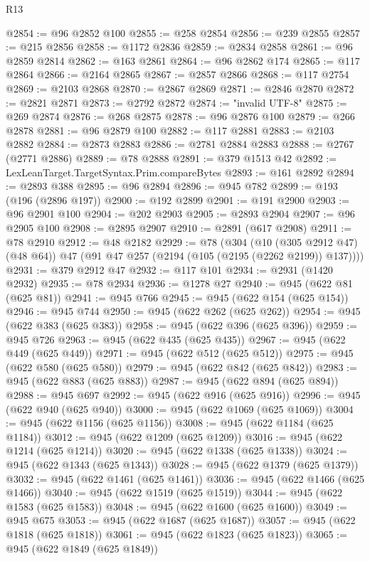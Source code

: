 \begin{lexlean}{R13}
\begin{coremodule}
@2854 := @96 @2852 @100
@2855 := @258 @2854
@2856 := @239 @2855
@2857 := @215 @2856
@2858 := @1172 @2836
@2859 := @2834 @2858
@2861 := @96 @2859 @2814
@2862 := @163 @2861
@2864 := @96 @2862 @174
@2865 := @117 @2864
@2866 := @2164 @2865
@2867 := @2857 @2866
@2868 := @117 @2754
@2869 := @2103 @2868
@2870 := @2867 @2869
@2871 := @2846 @2870
@2872 := @2821 @2871
@2873 := @2792 @2872
@2874 := "invalid UTF-8"
@2875 := @269 @2874
@2876 := @268 @2875
@2878 := @96 @2876 @100
@2879 := @266 @2878
@2881 := @96 @2879 @100
@2882 := @117 @2881
@2883 := @2103 @2882
@2884 := @2873 @2883
@2886 := @2781 @2884 @2883
@2888 := @2767 (@2771 @2886)
@2889 := @78 @2888
@2891 := @379 @1513 @42
@2892 := LexLeanTarget.TargetSyntax.Prim.compareBytes
@2893 := @161 @2892
@2894 := @2893 @388
@2895 := @96 @2894
@2896 := @945 @782
@2899 := @193 (@196 (@2896 @197))
@2900 := @192 @2899
@2901 := @191 @2900
@2903 := @96 @2901 @100
@2904 := @202 @2903
@2905 := @2893 @2904
@2907 := @96 @2905 @100
@2908 := @2895 @2907
@2910 := @2891 (@617 @2908)
@2911 := @78 @2910
@2912 := @48 @2182
@2929 := @78
    (@304
      (@10 (@305 @2912 @47) (@48 @64))
      @47
      (@91 @47 @257 (@2194 (@105 (@2195 (@2262 @2199)) @137))))
@2931 := @379 @2912 @47
@2932 := @117 @101
@2934 := @2931 (@1420 @2932)
@2935 := @78 @2934
@2936 := @1278 @27
@2940 := @945 (@622 @81 (@625 @81))
@2941 := @945 @766
@2945 := @945 (@622 @154 (@625 @154))
@2946 := @945 @744
@2950 := @945 (@622 @262 (@625 @262))
@2954 := @945 (@622 @383 (@625 @383))
@2958 := @945 (@622 @396 (@625 @396))
@2959 := @945 @726
@2963 := @945 (@622 @435 (@625 @435))
@2967 := @945 (@622 @449 (@625 @449))
@2971 := @945 (@622 @512 (@625 @512))
@2975 := @945 (@622 @580 (@625 @580))
@2979 := @945 (@622 @842 (@625 @842))
@2983 := @945 (@622 @883 (@625 @883))
@2987 := @945 (@622 @894 (@625 @894))
@2988 := @945 @697
@2992 := @945 (@622 @916 (@625 @916))
@2996 := @945 (@622 @940 (@625 @940))
@3000 := @945 (@622 @1069 (@625 @1069))
@3004 := @945 (@622 @1156 (@625 @1156))
@3008 := @945 (@622 @1184 (@625 @1184))
@3012 := @945 (@622 @1209 (@625 @1209))
@3016 := @945 (@622 @1214 (@625 @1214))
@3020 := @945 (@622 @1338 (@625 @1338))
@3024 := @945 (@622 @1343 (@625 @1343))
@3028 := @945 (@622 @1379 (@625 @1379))
@3032 := @945 (@622 @1461 (@625 @1461))
@3036 := @945 (@622 @1466 (@625 @1466))
@3040 := @945 (@622 @1519 (@625 @1519))
@3044 := @945 (@622 @1583 (@625 @1583))
@3048 := @945 (@622 @1600 (@625 @1600))
@3049 := @945 @675
@3053 := @945 (@622 @1687 (@625 @1687))
@3057 := @945 (@622 @1818 (@625 @1818))
@3061 := @945 (@622 @1823 (@625 @1823))
@3065 := @945 (@622 @1849 (@625 @1849))

\end{coremodule}
\end{lexlean}

